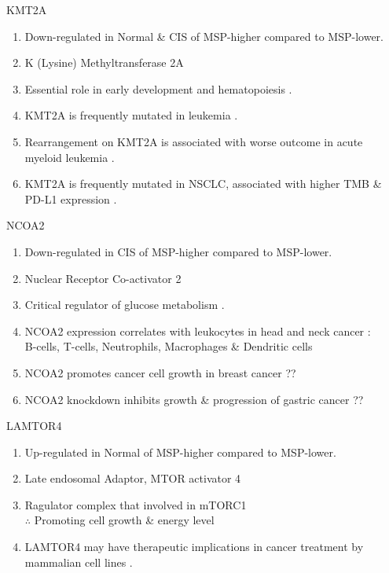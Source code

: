 \documentclass{beamer}
\begin{document}
\begin{frame}[allowframebreaks]
        \begin{block}{KMT2A}
            \begin{enumerate}
                \item Down-regulated in Normal \& CIS of MSP-higher compared to MSP-lower.
                \item K (Lysine) Methyltransferase 2A
                \item Essential role in early development and hematopoiesis \cite{KMT2A-1, KMT2A-2}.
                \item KMT2A is frequently mutated in leukemia \cite{KMT2A-3, KMT2A-4}.
                \item Rearrangement on KMT2A is associated with worse outcome in acute myeloid leukemia \cite{KMT2A-6}.
                \item KMT2A is frequently mutated in NSCLC, associated with higher TMB \& PD-L1 expression \cite{KMT2A-5}.
            \end{enumerate}
        \end{block}

         \begin{block}{NCOA2}
            \begin{enumerate}
                \item Down-regulated in CIS of MSP-higher compared to MSP-lower.
                \item Nuclear Receptor Co-activator 2
                \item Critical regulator of glucose metabolism \cite{NCOA2-1}.
                \item NCOA2 expression correlates with leukocytes in head and neck cancer \cite{NCOA2-2}: \\
                    B-cells, T-cells, Neutrophils, Macrophages \& Dendritic cells
                \item NCOA2 promotes cancer cell growth in breast cancer \cite{NCOA2-3} ??
                \item NCOA2 knockdown inhibits growth \& progression of gastric cancer \cite{NCOA2-4} ??
            \end{enumerate}
        \end{block}

        \begin{block}{LAMTOR4}
            \begin{enumerate}
                \item Up-regulated in Normal of MSP-higher compared to MSP-lower.
                \item Late endosomal Adaptor, MTOR activator 4
                \item Ragulator complex that involved in mTORC1 \cite{LAMTOR4-1} \\
                $\therefore$ Promoting cell growth \& energy level
                \item LAMTOR4 may have therapeutic implications in cancer treatment by mammalian cell lines \cite{LAMTOR4-2}.
            \end{enumerate}
        \end{block}


\end{frame}
\end{document}
